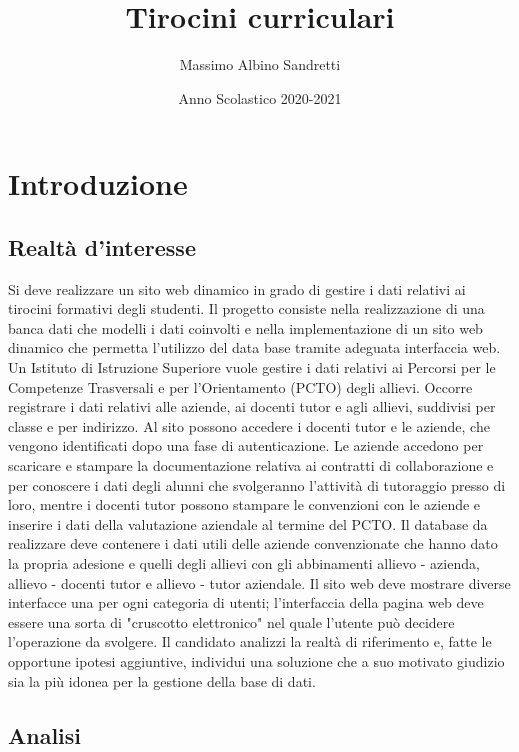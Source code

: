 \documentclass{article}
\title{Tirocini curriculari}
\author{Massimo Albino Sandretti}
\date{Anno Scolastico 2020-2021}
\begin{document}
\maketitle


\tableofcontents
\newpage

\section{Introduzione}
\subsection{Realtà d'interesse}
Si deve realizzare un sito web dinamico in grado di gestire i dati relativi ai tirocini formativi degli studenti.
Il progetto consiste nella realizzazione di una banca dati che modelli i dati coinvolti e nella implementazione
di un sito web dinamico che permetta l'utilizzo del data base tramite adeguata interfaccia web.
Un Istituto di Istruzione Superiore vuole gestire i dati relativi ai Percorsi per le Competenze Trasversali e per
l’Orientamento (PCTO) degli allievi.
Occorre registrare i dati relativi alle aziende, ai docenti tutor e agli allievi, suddivisi per classe e per indirizzo.
Al sito possono accedere i docenti tutor e le aziende, che vengono identificati dopo una fase di autenticazione.
Le aziende accedono per scaricare e stampare la documentazione relativa ai contratti di collaborazione e per
conoscere i dati degli alunni che svolgeranno l'attività di tutoraggio presso di loro, mentre i docenti tutor
possono stampare le convenzioni con le aziende e inserire i dati della valutazione aziendale al termine del
PCTO.
Il database da realizzare deve contenere i dati utili delle aziende convenzionate che hanno dato la propria
adesione e quelli degli allievi con gli abbinamenti allievo - azienda, allievo - docenti tutor e allievo - tutor
aziendale.
Il sito web deve mostrare diverse interfacce una per ogni categoria di utenti; l'interfaccia della pagina web deve
essere una sorta di "cruscotto elettronico" nel quale l'utente può decidere l'operazione da svolgere.
Il candidato analizzi la realtà di riferimento e, fatte le opportune ipotesi aggiuntive, individui una soluzione
che a suo motivato giudizio sia la più idonea per la gestione della base di dati.
\subsection{Analisi}
\end{document}
